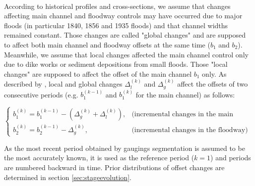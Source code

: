 \documentclass[11pt]{article}
\begin{document}
    \paragraph{}
    According to historical profiles and cross-sections, we assume that changes affecting main channel and floodway controls may have occurred due to major floods (in particular 1840, 1856 and 1935 floods) and that channel widths remained constant. Those changes are called "global changes" and are supposed to affect both main channel and floodway offsets at the same time ($b_1$ and $b_2$). 
    Meanwhile, we assume that local changes affected the main channel control only due to dike works or sediment depositions from small floods. Those "local changes" are supposed to affect the offset of the main channel $b_1$ only. As described by \citet{mansanarez_shift_2019}, local and global changes $\Delta_l^{(k)}$ and $\Delta_g^{(k)}$ affect the offsets of two consecutive periods (e.g. $b_1^{(k-1)}$ and $b_1^{(k)}$ for the main channel) as follows: 
       
       \begin{equation}
          \begin{cases}
           b_1^{(k)} = b_1^{(k-1)}-(\Delta_g^{(k)}+\Delta_l^{(k)}), & \text{(incremental changes in the main channel)}\\
           b_2^{(k)} = b_2^{(k-1)}-\Delta_g^{(k)}, & \text{(incremental changes in the floodway)}
          \end{cases}
          \label{eq:SPD_Pt}
        \end{equation}
       
       As the most recent period obtained by gaugings segmentation is assumed to be the most accurately known, it is used as the reference period ($k=1$) and periods are numbered backward in time. Prior distributions of offset changes are determined in section \ref{sec:stageevolution}.       
\end{document}
